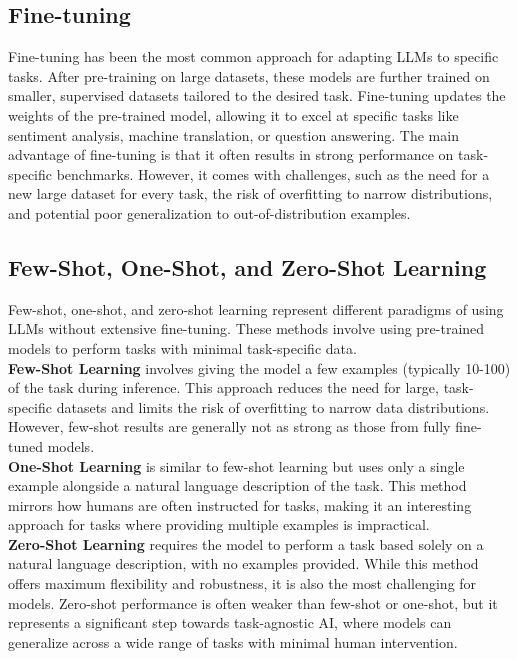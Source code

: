 \subsection{Fine-tuning }
Fine-tuning has been the most common approach for adapting LLMs to specific tasks. After pre-training on large datasets, these models are further trained on smaller, supervised datasets tailored to the desired task. Fine-tuning updates the weights of the pre-trained model, allowing it to excel at specific tasks like sentiment analysis, machine translation, or question answering. The main advantage of fine-tuning is that it often results in strong performance on task-specific benchmarks. However, it comes with challenges, such as the need for a new large dataset for every task, the risk of overfitting to narrow distributions, and potential poor generalization to out-of-distribution examples\cite{touvron2023llama}.
\subsection{Few-Shot, One-Shot, and Zero-Shot Learning}
Few-shot, one-shot, and zero-shot learning represent different paradigms of using LLMs without extensive fine-tuning. These methods involve using pre-trained models to perform tasks with minimal task-specific data.\\
\textbf{Few-Shot Learning} involves giving the model a few examples (typically 10-100) of the task during inference. This approach reduces the need for large, task-specific datasets and limits the risk of overfitting to narrow data distributions. However, few-shot results are generally not as strong as those from fully fine-tuned models.\\
\textbf{One-Shot Learning} is similar to few-shot learning but uses only a single example alongside a natural language description of the task. This method mirrors how humans are often instructed for tasks, making it an interesting approach for tasks where providing multiple examples is impractical.\\
\textbf{Zero-Shot Learning} requires the model to perform a task based solely on a natural language description, with no examples provided. While this method offers maximum flexibility and robustness, it is also the most challenging for models. Zero-shot performance is often weaker than few-shot or one-shot, but it represents a significant step towards task-agnostic AI, where models can generalize across a wide range of tasks with minimal human intervention\cite{brown2020language}.
